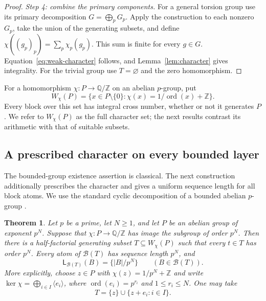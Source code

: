 \documentclass[11pt,reqno]{amsart}
\numberwithin{equation}{section}
\newtheorem{theorem}{Theorem}[section]
\theoremstyle{definition}
\theoremstyle{remark}
\newcommand{\Z}{\mathbb Z}
\newcommand{\Q}{\mathbb Q}
\newcommand{\B}{\mathcal B}
\newcommand{\LL}{\mathsf L}
\DeclareMathOperator{\ord}{ord}
\begin{document}
\begin{proof}
\emph{Step 4: combine the primary components.}
For a general torsion group use its primary decomposition
$G=\bigoplus_p G_p$. Apply the construction to each nonzero
$G_p$, take the union of the generating subsets, and define
$\chi((g_p)_p)=\sum_p\chi_p(g_p)$. This sum is finite for every
$g\in G$. Equation~\eqref{eq:weak-character} follows, and
Lemma~\ref{lem:character} gives integrality. For the trivial group
use $T=\varnothing$ and the zero homomorphism.
\end{proof}

For a homomorphism $\chi:P\to\Q/\Z$ on an abelian $p$-group, put
\begin{equation}\label{eq:admissible-set}
 W_\chi(P)=\{x\in P\setminus\{0\}:
                    \chi(x)=1/\ord(x)+\Z\}.
\end{equation}
Every block over this set has integral cross number, whether or not
it generates $P$. We refer to $W_\chi(P)$ as the full character set; the next results
contrast its arithmetic with that of suitable subsets.

\subsection{A prescribed character on every bounded layer}

The bounded-group existence assertion is classical. The next
construction additionally prescribes the character and gives a
uniform sequence length for all block atoms. We use the standard
cyclic decomposition of a bounded abelian $p$-group \cite{Fuchs}.

\begin{theorem}
\label{thm:bounded-character}
Let $p$ be a prime, let $N\ge1$, and let $P$ be an abelian group of
exponent $p^N$. Suppose that $\chi:P\to\Q/\Z$ has image the subgroup
of order $p^N$. Then there is a half-factorial generating subset
$T\subseteq W_\chi(P)$ such that every $t\in T$ has order $p^N$.
Every atom of $\B(T)$ has sequence length $p^N$, and
\[
 \LL_{\B(T)}(B)=\{|B|/p^N\}\qquad(B\in\B(T)).
\]
More explicitly, choose $z\in P$ with
$\chi(z)=1/p^N+\Z$ and write
$\ker\chi=\bigoplus_{i\in I}\langle e_i\rangle$, where
$\ord(e_i)=p^{r_i}$ and $1\le r_i\le N$. One may take
\begin{equation}\label{eq:bounded-shear}
 T=\{z\}\cup\{z+e_i:i\in I\}.
\end{equation}
\end{theorem}
\end{document}
